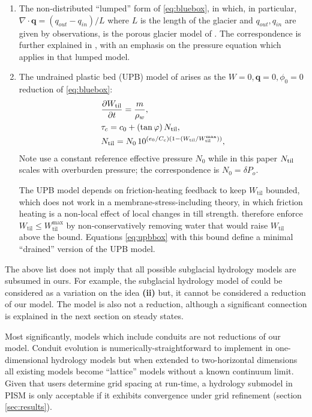 \documentclass[gmd]{copernicus}   %
\newcommand{\text}{\textrm}
\newcommand\bq{\mathbf{q}}
\newcommand{\ddt}[1]{\ensuremath{\frac{\partial #1}{\partial t}}}
\newcommand{\Div}{\nabla\cdot}
\newcommand{\Wtil}{W_{\text{til}}}
\newcommand{\Wtilmax}{W_{\text{til}}^{\text{max}}}
\begin{document}
\begin{enumerate}
\item The non-distributed ``lumped'' form of \eqref{eq:bluebox}, in which, in particular, $\Div \bq = (q_{out} - q_{in})/L$ where $L$ is the length of the glacier and $q_{out},q_{in}$ are given by observations, is the porous glacier model of \cite{Bartholomausetal2011}.  The correspondence is further explained in \cite{Bueler2014correspondence}, with an emphasis on the pressure equation which applies in that lumped model.

\item The undrained plastic bed (UPB) model of \cite{Tulaczyketal2000b} arises as the $W=0,\bq=0,\phi_0=0$ reduction of \eqref{eq:bluebox}:
\begin{align}
&\ddt{\Wtil} = \frac{m}{\rho_w}, \label{eq:upbbox} \\
&\tau_c = c_0 + (\tan \varphi)\, \Ntil, \notag \\
&\Ntil = N_0 \, 10^{(e_0/C_c) \left(1 - (\Wtil/\Wtilmax)\right)}, \notag
\end{align}
Note \cite{Tulaczyketal2000b} use a constant reference effective pressure $N_0$ while in this paper $\Ntil$ scales with overburden pressure; the correspondence is $N_0 = \delta P_o$.

The UPB model depends on friction-heating feedback to keep $\Wtil$ bounded, which does not work in a membrane-stress-including theory, in which friction heating is a non-local effect of local changes in till strength.  \cite{BBssasliding} therefore enforce $\Wtil \le \Wtilmax$ by non-conservatively removing water that would raise $\Wtil$ above the bound.  Equations \eqref{eq:upbbox} with this bound define a minimal ``drained'' version of the UPB model.
\end{enumerate}

The above list does not imply that all possible subglacial hydrology models are subsumed in ours.  For example, the subglacial hydrology model of \cite{JohnsonFastook} could be considered as a variation on the idea \textbf{(ii)} but, it cannot be considered a reduction of our model.  The \cite{FlowersClarke2002_theory} model is also not a reduction, although a significant connection is explained in the next section on steady states.

Most significantly, models which include conduits \citep[among others]{Schoofmeltsupply,PimentelFlowers2011,Hewittetal2012} are not reductions of our model.  Conduit evolution is numerically-straightforward to implement in one-dimensional hydrology models \citep{PimentelFlowers2011,Hewittetal2012,vanderWeletal2013} but when extended to two-horizontal dimensions all existing models \citep{Schoofmeltsupply,Hewitt2013,Werderetal2013} become ``lattice'' models without a known continuum limit.  Given that users determine grid spacing at run-time, a hydrology submodel in PISM is only acceptable if it exhibits convergence under grid refinement (section \ref{sec:results}).
\end{document}
